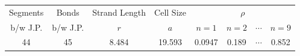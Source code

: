 \documentclass[11pt, dvipdfmx]{beamer}
\begin{document}
\begin{frame}
\vspace{-3mm}
\begin{table}[htb]
 \centering
	\scriptsize
 \begin{tabular} {|c|c|c|c|c|c|c|c|} \hline
Segments	& Bonds	& Strand Length	& Cell Size	& \multicolumn{4}{|c|}{$\rho$}			\\ \cline{5-8}
b/w J.P. 	& b/w J.P.	& $r$		& $a$				& $n=1$	& $n=2$	& $\cdots$	& $n=9$	\\ \hline \hline
44			&	45	&	8.484		&	19.593	& 0.0947	& 0.189	& $\cdots$	& {\color{red}0.852} 		\\ \hline
\end{tabular}
\end{table}
\end{frame}
\end{document}
